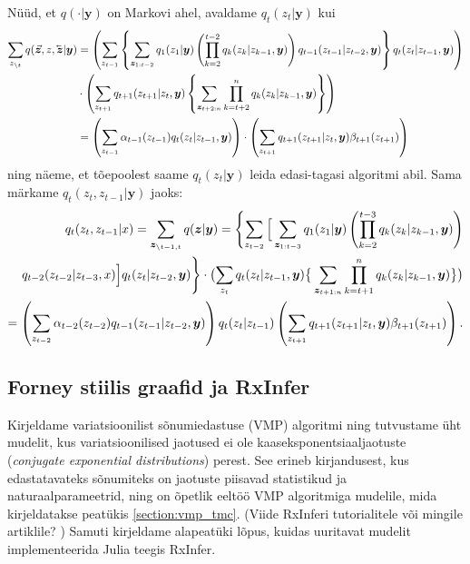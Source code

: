 Nüüd, et $q(\cdot | \bm{y})$ on Markovi ahel, avaldame $q_t (z_t | \bm{y})$ kui
\begin{align} \notag
    \sum_{ z_{\backslash t} } q(\vec{\bm{z}}, z, \cev{\bm{z}} | \bm{y}) &= \left( \sum_{z_{t-1}} \left\{ \sum_{\bm{z}_{1:t-2}} q_1(z_1 | \bm{y}) \left( \prod_{k=2}^{t-2} q_k(z_k | z_{k-1}, \bm{y}) \right) q_{t-1}(z_{t-1} | z_{t-2}, \bm{y}) \right\} q_t(z_t | z_{t-1}, \bm{y}) \right) \\
    \notag
    & \cdot \left( \sum_{z_{t+1}} q_{t+1}(z_{t+1} | z_t, \bm{y}) \left\{ \sum_{\bm{z}_{t+2:n}} \prod_{k=t+2}^n q_k(z_k|z_{k-1},\bm{y}) \right\} \right) \\
    \label{eq:fb1}
    &= \left( \sum_{z_{t-1}} \alpha_{t-1}(z_{t-1}) q_t(z_t | z_{t-1}, \bm{y}) \right) \cdot \left( \sum_{z_{t+1}} q_{t+1}(z_{t+1} | z_t, \bm{y}) \beta_{t+1}(z_{t+1}) \right)
\end{align}
ning näeme, et tõepoolest saame $q_t(z_t | \bm{y})$ leida edasi-tagasi algoritmi abil. Sama märkame $q_t(z_t, z_{t-1} | \bm{y})$ jaoks:
\begin{equation}
\begin{split}
\notag
     q_t (z_t,z_{t-1} | x) = \sum_{ \bm{z}_{\backslash t-1, t} } q(\bm{z} | \bm{y}) = \Biggl\{ \sum_{z_{t-2}} \Big[ \sum_{\bm{z}_{1:t-3}} q_1(z_1 | \bm{y}) \left( \prod_{k=2}^{t-3} q_k(z_k | z_{k-1}, \bm{y}) \right) \\
     q_{t-2}(z_{t-2} | z_{t-3}, x) \Big] q_t(z_t | z_{t-2}, \bm{y}) \Biggr\} \cdot \bigl( \sum_{z_t} q_{t}(z_{t} | z_{t-1}, \bm{y}) \big\{ \sum_{\bm{z}_{t+1:n}} \prod_{k=t+1}^n q_k(z_k|z_{k-1},\bm{y}) \big\} \bigr) \\
    \label{eq:fb2}
    = \left( \sum_{z_{t-2}} \alpha_{t-2}(z_{t-2}) q_{t-1}(z_{t-1} | z_{t-2}, \bm{y}) \right) q_{t}(z_{t} | z_{t-1}) \left( \sum_{z_{t+1}} q_{t+1}(z_{t+1} | z_{t}, \bm{y}) \beta_{t+1}(z_{t+1}) \right).
\end{split}
\end{equation}

\subsection{Forney stiilis graafid ja RxInfer}

Kirjeldame variatsioonilist sõnumiedastuse (VMP) algoritmi ning tutvustame üht mudelit, kus variatsioonilised jaotused ei ole kaaseksponentsiaaljaotuste (\emph{conjugate exponential distributions}) perest. See erineb kirjandusest, kus edastatavateks sõnumiteks on jaotuste piisavad statistikud ja naturaalparameetrid, ning on õpetlik eeltöö VMP algoritmiga mudelile, mida kirjeldatakse peatükis \ref{section:vmp_tmc}. (Viide RxInferi tutorialitele või mingile artiklile? \bla) Samuti kirjeldame alapeatüki lõpus, kuidas uuritavat mudelit implementeerida Julia teegis RxInfer.

